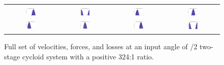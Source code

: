 \begin{figure}[h]
\begin{tabular}{cccc}
	   \\
	   \hline
	   \\
	   \includegraphics[width=0.23\textwidth]{fig/double_1_losses_0} &
	   \includegraphics[width=0.23\textwidth]{fig/double_1_losses_pi_2} &
	   \includegraphics[width=0.23\textwidth]{fig/double_1_losses_pi} &
	   \includegraphics[width=0.23\textwidth]{fig/double_1_losses_3pi_2} \\
	   \includegraphics[width=0.23\textwidth]{fig/double_2_losses_0} &
	   \includegraphics[width=0.23\textwidth]{fig/double_2_losses_pi_2} &
	   \includegraphics[width=0.23\textwidth]{fig/double_2_losses_pi} &
	   \includegraphics[width=0.25\textwidth]{fig/double_2_losses_3pi_2} \\
   \end{tabular}
   \caption{Full set of velocities, forces, and losses at an input angle of \textpi/2 two-stage cycloid system with a positive 324:1 ratio.}
   \label{fig:two_stage_forces_pos}
\end{figure}

